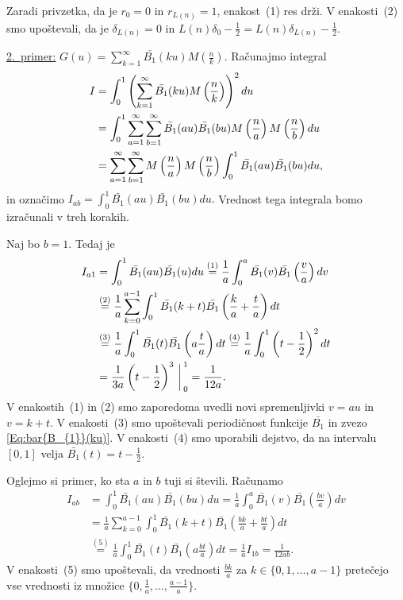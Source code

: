 \documentclass[mat1]{fmfdelo}
\begin{document}
Zaradi privzetka, da je $r_{0}=0$ in $r_{L(n)}=1$, enakost~(1) res drži.
V enakosti~(2) smo upoštevali, da je $\delta_{L(n)}=0$ in $L(n) \delta_{0}-\frac{1}{2} = L(n) \delta_{L(n)}-\frac{1}{2}.$

\underline{2.~primer:} $G(u) = \sum_{k=1}^{\infty} \bar{B_{1}}(ku) M \left(\frac{n}{k} \right)$.
Računajmo integral
\begin{align}
\label{Eq:I_{ab}}
I &= \int_{0}^1 \left( \sum_{k=1}^{\infty} \bar{B_{1}}(ku) M \left(\frac{n}{k} \right) \right)^2 du \nonumber \\
  &= \int_{0}^1 \sum_{a=1}^{\infty} \sum_{b=1}^{\infty} \bar{B_{1}}(au) \bar{B_{1}}(bu) M \left(\frac{n}{a} \right) M \left(\frac{n}{b} \right) du \nonumber \\
  &= \sum_{a=1}^{\infty} \sum_{b=1}^{\infty} M \left(\frac{n}{a} \right) M \left(\frac{n}{b} \right) \int_{0}^1 \bar{B_{1}}(au) \bar{B_{1}}(bu) du,
\end{align}
% 
in označimo $I_{ab} = \int_{0}^1 \bar{B_{1}}(au) \bar{B_{1}}(bu) du.$ Vrednost tega integrala bomo izračunali v treh korakih.

Naj bo $b=1$. Tedaj je
\begin{align}
I_{a1} &= \int_{0}^1 \bar{B_{1}}(au) \bar{B_{1}}(u) du
	\stackrel{(1)}{=} \frac{1}{a} \int_{0}^a \bar{B_{1}}(v) \bar{B_{1}} \left(\frac{v}{a} \right) dv \nonumber \\
	&\stackrel{(2)}{=} \frac{1}{a} \sum_{k=0}^{a-1} \int_{0}^1 \bar{B_{1}}(k+t) \bar{B_{1}} \left(\frac{k}{a}+\frac{t}{a} \right) dt \nonumber \\
	&\stackrel{(3)}{=} \frac{1}{a} \int_{0}^1 \bar{B_{1}}(t) \bar{B_{1}} \left(a\frac{t}{a} \right) dt
	\stackrel{(4)}{=} \frac{1}{a} \int_{0}^1 \left( t-\frac{1}{2} \right)^2 dt \nonumber \\
	&= \frac{1}{3a} \left( t-\frac{1}{2} \right)^3 \bigg \arrowvert_{0}^{1}
	= \frac{1}{12a}.
\end{align}
V enakostih~(1) in (2) smo zaporedoma uvedli novi spremenljivki $v=au$ in $v=k+t$. V enakosti~(3) smo upoštevali periodičnost funkcije $\bar{B_{1}}$ in zvezo \eqref{Eq:bar{B_{1}}(ku)}. V enakosti~(4) smo uporabili dejstvo, da na intervalu $[0,1]$ velja $\bar{B_{1}}(t) = t-\frac{1}{2}$.

Oglejmo si primer, ko sta $a$ in $b$ tuji si števili. Računamo
\begin{align}
I_{ab} &= \int_{0}^1 \bar{B_{1}}(au) \bar{B_{1}}(bu) du
	= \frac{1}{a} \int_{0}^a \bar{B_{1}}(v) \bar{B_{1}} \left(\frac{bv}{a} \right) dv \nonumber \\
	&= \frac{1}{a} \sum_{k=0}^{a-1} \int_{0}^1 \bar{B_{1}}(k+t) \bar{B_{1}} \left(\frac{bk}{a}+\frac{bt}{a} \right) dt \nonumber \\
	&\stackrel{(5)}{=} \frac{1}{a} \int_{0}^1 \bar{B_{1}}(t) \bar{B_{1}} \left(a\frac{bt}{a} \right) dt
	= \frac{1}{a} I_{1b} 
	= \frac{1}{12ab}.
\end{align}
V enakosti~(5) smo upoštevali, da vrednosti $\frac{bk}{a}$ za $k \in \{0,1, \ldots, {a-1} \}$ pretečejo vse vrednosti iz množice $\{0, \frac{1}{a}, \ldots, \frac{a-1}{a}\}$.
\end{document}
